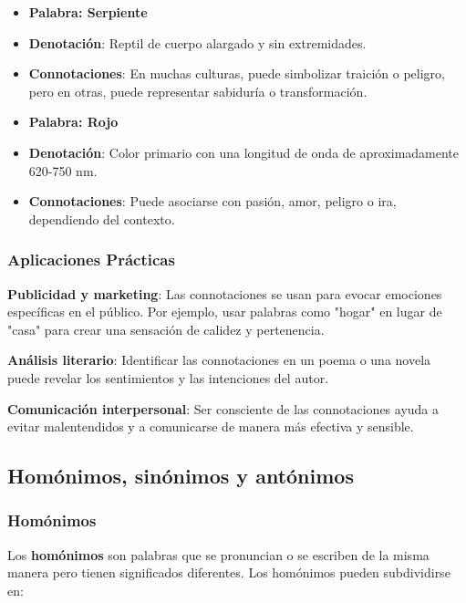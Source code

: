 \begin{itemize}
      \item \textbf{Palabra: Serpiente}
      \item \textbf{Denotación}: Reptil de cuerpo alargado y sin extremidades.
      \item  \textbf{Connotaciones}: En muchas culturas, puede simbolizar traición o peligro, pero en otras, puede representar sabiduría o transformación.
\end{itemize}

\begin{itemize}
      \item \textbf{Palabra: Rojo}
      \item \textbf{Denotación}: Color primario con una longitud de onda de aproximadamente 620-750 nm.
      \item \textbf{Connotaciones}: Puede asociarse con pasión, amor, peligro o ira, dependiendo del contexto.
\end{itemize}

\subsubsection{Aplicaciones Prácticas}

\textbf{Publicidad y marketing}: Las connotaciones se usan para evocar emociones específicas en el público. Por ejemplo, usar palabras como "hogar" en lugar de "casa" para crear una sensación de calidez y pertenencia.

\textbf{Análisis literario}: Identificar las connotaciones en un poema o una novela puede revelar los sentimientos y las intenciones del autor.

\textbf{Comunicación interpersonal}: Ser consciente de las connotaciones ayuda a evitar malentendidos y a comunicarse de manera más efectiva y sensible.

\subsection{Homónimos, sinónimos y antónimos}

\subsubsection{Homónimos}

Los \textbf{homónimos} son palabras que se pronuncian o se escriben de la misma manera pero tienen significados diferentes. Los homónimos pueden subdividirse en:

